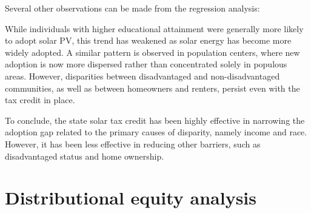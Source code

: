 \documentclass[11pt,twoside,letterpaper]{article}
\begin{document}

Several other observations can be made from the regression analysis: 

While individuals with higher educational attainment were generally more likely to adopt solar PV, this trend has weakened as solar energy has become more widely adopted. A similar pattern is observed in population centers, where new adoption is now more dispersed rather than concentrated solely in populous areas. However, disparities between disadvantaged and non-disadvantaged communities, as well as between homeowners and renters, persist even with the tax credit in place.


To conclude, the state solar tax credit has been highly effective in narrowing the adoption gap related to the primary causes of disparity, namely income and race. However, it has been less effective in reducing other barriers, such as disadvantaged status and home ownership.



\section{Distributional equity analysis}
\end{document}
